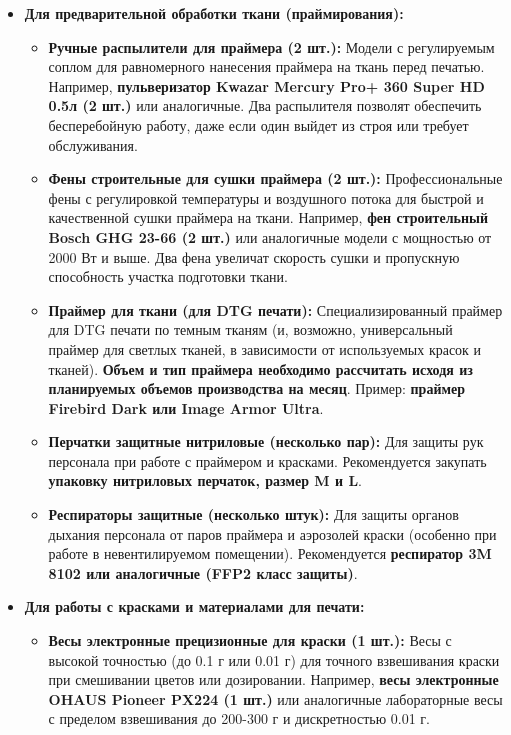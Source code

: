 \begin{itemize}
        \begin{itemize}
            \item \textbf{Для предварительной обработки ткани (праймирования):}
                \begin{itemize}
                    \item \textbf{Ручные распылители для праймера (2 шт.):}  Модели с регулируемым соплом для равномерного нанесения праймера на ткань перед печатью.  Например, \textbf{пульверизатор Kwazar Mercury Pro+ 360 Super HD 0.5л (2 шт.)} или аналогичные.  Два распылителя позволят обеспечить бесперебойную работу, даже если один выйдет из строя или требует обслуживания.
                    \item \textbf{Фены строительные для сушки праймера (2 шт.):}  Профессиональные фены с регулировкой температуры и воздушного потока для быстрой и качественной сушки праймера на ткани.  Например, \textbf{фен строительный Bosch GHG 23-66 (2 шт.)} или аналогичные модели с мощностью от 2000 Вт и выше.  Два фена увеличат скорость сушки и пропускную способность участка подготовки ткани.
                    \item \textbf{Праймер для ткани (для DTG печати):}  Специализированный праймер для DTG печати по темным тканям (и, возможно, универсальный праймер для светлых тканей, в зависимости от используемых красок и тканей).  \textbf{Объем и тип праймера необходимо рассчитать исходя из планируемых объемов производства на месяц}.  Пример: \textbf{праймер Firebird Dark или Image Armor Ultra}.
                    \item \textbf{Перчатки защитные нитриловые (несколько пар):}  Для защиты рук персонала при работе с праймером и красками.  Рекомендуется закупать \textbf{упаковку нитриловых перчаток, размер M и L}.
                    \item \textbf{Респираторы защитные (несколько штук):}  Для защиты органов дыхания персонала от паров праймера и аэрозолей краски (особенно при работе в невентилируемом помещении).  Рекомендуется \textbf{респиратор 3M 8102 или аналогичные (FFP2 класс защиты)}.
                \end{itemize}
            \item \textbf{Для работы с красками и материалами для печати:}
                \begin{itemize}
                    \item \textbf{Весы электронные прецизионные для краски (1 шт.):}  Весы с высокой точностью (до 0.1 г или 0.01 г) для точного взвешивания краски при смешивании цветов или дозировании.  Например, \textbf{весы электронные OHAUS Pioneer PX224 (1 шт.)} или аналогичные лабораторные весы с пределом взвешивания до 200-300 г и дискретностью 0.01 г.

\end{itemize}
\end{itemize}
\end{itemize}
